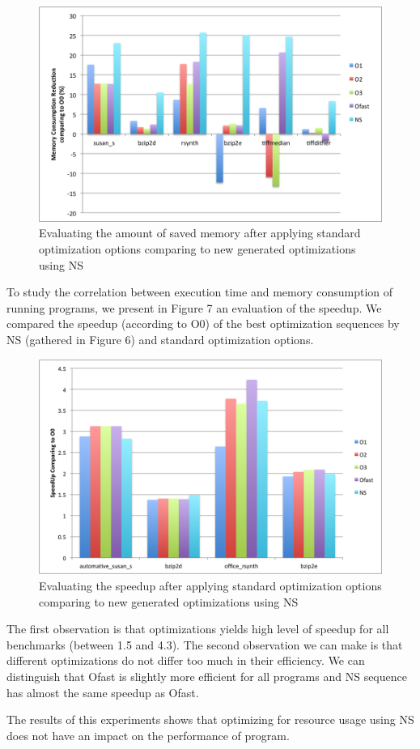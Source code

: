 \begin{figure}[h]
	\centering
	\includegraphics[scale=0.50]{Ressources/infra_novelty_stat3.png}
	\caption{Evaluating the amount of saved memory after applying standard optimization options comparing to new generated optimizations using NS}
\end{figure}
To study the correlation between execution time and memory consumption of running programs, we present in Figure 7 an evaluation of the speedup. We compared the speedup (according to O0) of the best optimization sequences by NS (gathered in Figure 6) and standard optimization options. 
\begin{figure}[h]
	\centering
	\includegraphics[scale=0.45]{Ressources/infra_novelty_stat2.png}
	\caption{Evaluating the speedup after applying standard optimization options comparing to new generated optimizations using NS}
\end{figure}
The first observation is that optimizations yields high level of speedup for all benchmarks (between 1.5 and 4.3).
The second observation we can make is that different optimizations do not differ too much in their
efficiency. We can distinguish that Ofast is slightly more efficient for all programs and NS sequence has almost the same speedup as Ofast. 

The results of this experiments shows that optimizing for resource usage using NS does not have an impact on the performance of program.

